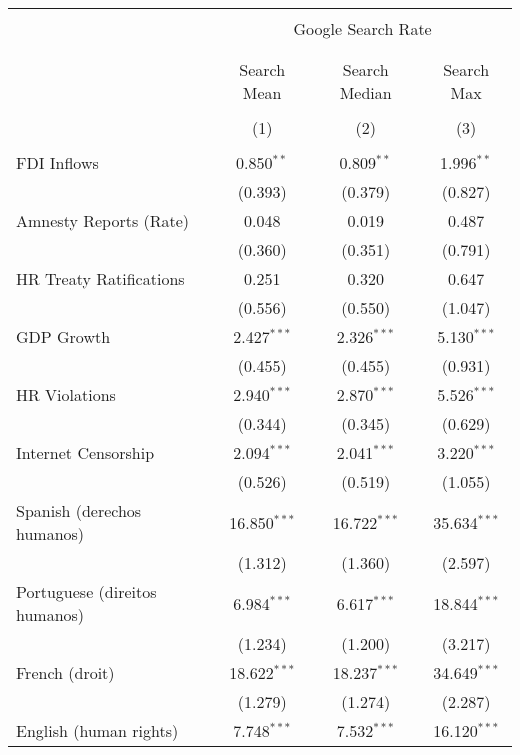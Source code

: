 
\begin{table}[!htbp] \centering 
  \caption{} 
  \label{} 
\begin{tabular}{@{\extracolsep{5pt}}lccc} 
\\[-1.8ex]\hline 
\hline \\[-1.8ex] 
 & \multicolumn{3}{c}{Google Search Rate} \\ 
\cline{2-4} 
\\[-1.8ex] & \multicolumn{3}{c}{ } \\ 
 & Search Mean & Search Median & Search Max \\ 
\\[-1.8ex] & (1) & (2) & (3)\\ 
\hline \\[-1.8ex] 
 FDI Inflows & 0.850$^{**}$ & 0.809$^{**}$ & 1.996$^{**}$ \\ 
  & (0.393) & (0.379) & (0.827) \\ 
  Amnesty Reports (Rate) & 0.048 & 0.019 & 0.487 \\ 
  & (0.360) & (0.351) & (0.791) \\ 
  HR Treaty Ratifications & 0.251 & 0.320 & 0.647 \\ 
  & (0.556) & (0.550) & (1.047) \\ 
  GDP Growth & 2.427$^{***}$ & 2.326$^{***}$ & 5.130$^{***}$ \\ 
  & (0.455) & (0.455) & (0.931) \\ 
  HR Violations & 2.940$^{***}$ & 2.870$^{***}$ & 5.526$^{***}$ \\ 
  & (0.344) & (0.345) & (0.629) \\ 
  Internet Censorship & 2.094$^{***}$ & 2.041$^{***}$ & 3.220$^{***}$ \\ 
  & (0.526) & (0.519) & (1.055) \\ 
  Spanish (derechos humanos) & 16.850$^{***}$ & 16.722$^{***}$ & 35.634$^{***}$ \\ 
  & (1.312) & (1.360) & (2.597) \\ 
  Portuguese (direitos humanos) & 6.984$^{***}$ & 6.617$^{***}$ & 18.844$^{***}$ \\ 
  & (1.234) & (1.200) & (3.217) \\ 
  French (droit) & 18.622$^{***}$ & 18.237$^{***}$ & 34.649$^{***}$ \\ 
  & (1.279) & (1.274) & (2.287) \\ 
  English (human rights) & 7.748$^{***}$ & 7.532$^{***}$ & 16.120$^{***}$ \\ 

\end{tabular}
\end{table}
